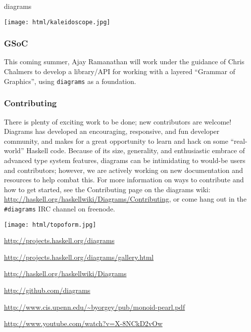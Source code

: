 \begin{hcarentry}[updated]{diagrams}
\begin{center}
\texttt{[image: html/kaleidoscope.jpg]}
\end{center}

\subsubsection*{GSoC}

This coming summer, Ajay Ramanathan will work under the guidance of
Chris Chalmers to develop a library/API for working with a layered
``Grammar of Graphics'', using \texttt{diagrams} as a foundation.

\subsubsection*{Contributing}

There is plenty of exciting work to be done; new contributors are
welcome!  Diagrams has developed an encouraging, responsive, and fun
developer community, and makes for a great opportunity to learn and
hack on some ``real-world'' Haskell code.  Because of its size,
generality, and enthusiastic embrace of advanced type system features,
diagrams can be intimidating to would-be users and contributors;
however, we are actively working on new documentation and resources to
help combat this.  For more information on ways to contribute and how
to get started, see the Contributing page on the diagrams wiki:
\url{http://haskell.org/haskellwiki/Diagrams/Contributing}, or come
hang out in the \texttt{\#diagrams} IRC channel on freenode.

\begin{center}
\texttt{[image: html/topoform.jpg]}
\end{center}

\FurtherReading
\begin{compactitem}
\item \url{http://projects.haskell.org/diagrams}
\item \url{http://projects.haskell.org/diagrams/gallery.html}
\item \url{http://haskell.org/haskellwiki/Diagrams}
\item \url{http://github.com/diagrams}
\item \url{http://www.cis.upenn.edu/~byorgey/pub/monoid-pearl.pdf}
\item \url{http://www.youtube.com/watch?v=X-8NCkD2vOw}
\end{compactitem}
\end{hcarentry}
